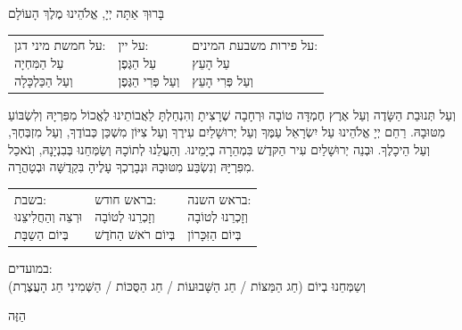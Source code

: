 \documentclass[11pt,twoside]{article}
\newcommand{\instruction}[1]{%
\ifhmode\else\noindent\fi%
{\plain\tiny{#1}}%
}
\begin{document}
{\centering%
בָּרוּךְ אַתָּה יְיָ, אֱלֹהֵינוּ מֶלֶךְ הָעוֹלָם

\footnotesize%
\begin{tabularx}{\textwidth}{XXX}
  \makecell{\instruction{על חמשת מיני דגן:}\\עַל הַמִּחְיָה\\וְעַל הַכַּלְכָּלָה} &
  \makecell{\instruction{על יין:}\\עַל הַגֶּפֶן\\וְעַל פְּרִי הַגֶּפֶן} &
  \makecell{\instruction{על פירות משבעת המינים:}\\עַל הָעֵץ\\וְעַל פְּרִי הָעֵץ} \\
\end{tabularx}\par
}

{\small%
\setlength{\leftskip}{0pt plus -0.5fil}%
\setlength{\rightskip}{0pt plus 0.5fil}%
וְעַל תְּנוּבַת הַשָּׂדֶה וְעַל אֶרֶץ חֶמְדָּה טוֹבָה וּרְחָבָה שֶׁרָצִיתָ וְהִנְחַלְתָּ לַאֲבוֹתֵינוּ לֶאֱכוֹל
מִפִּרְיָהּ וְלִשְׂבּוֹעַ מִטּוּבָהּ. רַחֵם יְיָ אֱלֹהֵינוּ עַל יִשְׂרָאֵל עַמֶּךָ וְעַל יְרוּשָׁלַיִם עִירֶךָ
וְעַל צִיּוֹן מִשְׁכַּן כְּבוֹדֶךָ, וְעַל מִזְבְּחֶךָ, וְעַל הֵיכָלֶךָ. וּבְנֵה יְרוּשָׁלַיִם עִיר הַקּדֶשׁ בִּמְהֵרָה
בְיָמֵינוּ. וְהַעֲלֵנוּ לְתוֹכָהּ וְשַׂמְּחֵנוּ בְּבִנְיָנָהּ, וְנֹאכַל מִפִּרְיָּהּ וְנִשְׂבַּע מִטּוּבָהּ וּנְבָרֶכְךָ
עָלֶיהָ בִּקְדֻשָּׁה וּבְטָהֳרָה.\par}

{\centering\scriptsize%
\begin{tabularx}{\textwidth}{XXX}
  \makecell{\instruction{בשבת:}\\וּרְצֵה וְהַחֲלִיצֵנוּ\\בְּיוֹם הַשַבָּת} &
  \makecell{\instruction{בראש חודש:}\\וְזָכְרֵנוּ לְטוֹבָה\\בְּיוֹם רֹאשׁ הַחֹדֶשׁ} &
  \makecell{\instruction{בראש השנה:}\\וְזָכְרֵנוּ לְטוֹבָה\\בְּיוֹם הַזִּכָּרוֹן}
\end{tabularx}\par
\instruction{במועדים:}\\וְשַמְּחֵנוּ בְיוֹם (חַג הַמַּצּוֹת / חַג הַשָּׁבוּעוֹת / חַג הַסֻּכּוֹת / הַשְּׁמִינִי חַג הָעֲצֶרֶת)%

הַזֶּה\par
}
\end{document}
